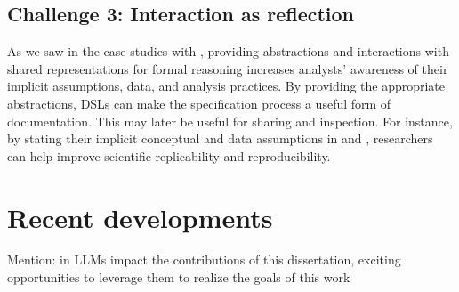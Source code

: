 \begin{comment}
Our experiences designing shared representations in \tea and \tisane highlight
another under-stated benefit of 

Interaction is not just for getting the system to find an answer but a way for
users to be able to not only incrementally express their intents for analysis
but also reflect and refine their understanding of the domain and data. In other
words, finding and using shared representations require designing not only the
programming abstractions but also the interactions with the abstractions. 


\end{comment}

\subsection{Challenge 3: Interaction as reflection}
As we saw in the case studies with \tisane, providing abstractions and
interactions with shared representations for formal reasoning increases
analysts' awareness of their implicit assumptions, data, and analysis practices.
By providing the appropriate abstractions, DSLs can make the specification
process a useful form of documentation. This may later be useful for sharing and
inspection. For instance, by stating their implicit conceptual and data
assumptions in \tea and \tisane, researchers can help improve scientific
replicability and reproducibility. 


\section{Recent developments} \label{sec:recentDevelopments}
Mention: in LLMs impact the contributions of this dissertation, exciting opportunities to leverage them to realize the goals of this work

